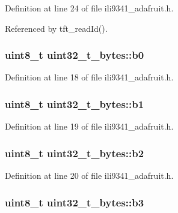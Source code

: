 Definition at line 24 of file ili9341\-\_\-adafruit.\-h.



Referenced by tft\-\_\-read\-Id().

\hypertarget{unionuint32__t__bytes_a92b86537decb69327191d870f41c60f7}{
\subsubsection[{b0}]{\setlength{\rightskip}{0pt plus 5cm}uint8\-\_\-t uint32\-\_\-t\-\_\-bytes\-::b0}}\label{unionuint32__t__bytes_a92b86537decb69327191d870f41c60f7}


Definition at line 18 of file ili9341\-\_\-adafruit.\-h.

\hypertarget{unionuint32__t__bytes_a91fb31482a2ce44b454fca964dcd556b}{
\subsubsection[{b1}]{\setlength{\rightskip}{0pt plus 5cm}uint8\-\_\-t uint32\-\_\-t\-\_\-bytes\-::b1}}\label{unionuint32__t__bytes_a91fb31482a2ce44b454fca964dcd556b}


Definition at line 19 of file ili9341\-\_\-adafruit.\-h.

\hypertarget{unionuint32__t__bytes_a462312b99de0c6d1c497064902196e1d}{
\subsubsection[{b2}]{\setlength{\rightskip}{0pt plus 5cm}uint8\-\_\-t uint32\-\_\-t\-\_\-bytes\-::b2}}\label{unionuint32__t__bytes_a462312b99de0c6d1c497064902196e1d}


Definition at line 20 of file ili9341\-\_\-adafruit.\-h.

\hypertarget{unionuint32__t__bytes_abd7739cae59fab7cf712d53f337b378a}{
\subsubsection[{b3}]{\setlength{\rightskip}{0pt plus 5cm}uint8\-\_\-t uint32\-\_\-t\-\_\-bytes\-::b3}}\label{unionuint32__t__bytes_abd7739cae59fab7cf712d53f337b378a}


